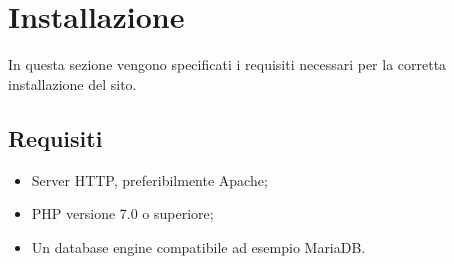 \section{Installazione}
In questa sezione vengono specificati i requisiti necessari per la corretta installazione del sito.
\subsection{Requisiti}
\begin{itemize}
\item Server HTTP, preferibilmente  Apache;
\item PHP versione 7.0 o superiore;
\item Un database engine compatibile ad esempio MariaDB.
\end{itemize}
